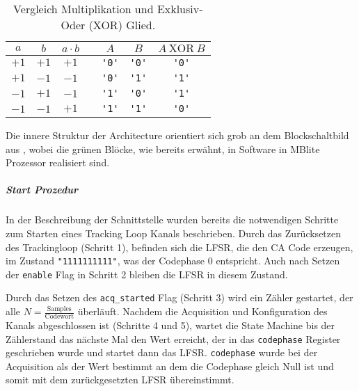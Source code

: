 \begin{table}[H]
    \ttabbox
    {
        \caption[Exklusiv-Oder Glied vs. Multiplikation]{Vergleich Multiplikation und Exklusiv-Oder (XOR) Glied.}
        \label{TabXOR}
    }
    {
    \begin{tabular}{c c c c c c c}
        \toprule
        $a$ 	& $b$ 	& $a\cdot b$ 	& & $A$	& $B$		& $A~ \textrm{XOR} ~B$ \\
        \midrule
        $+1$	& $+1$ 	& $+1$ 		& & \lstinline$'0'$	& \lstinline$'0'$ & \lstinline$'0'$\\
        $+1$	& $-1$ 	& $-1$ 		& & \lstinline$'0'$	& \lstinline$'1'$ & \lstinline$'1'$\\
        $-1$	& $+1$ 	& $-1$ 		& & \lstinline$'1'$	& \lstinline$'0'$ & \lstinline$'1'$\\
        $-1$	& $-1$ 	& $+1$ 		& & \lstinline$'1'$	& \lstinline$'1'$ & \lstinline$'0'$\\
        \bottomrule
    \end{tabular}
}
\end{table}

Die innere Struktur der Architecture orientiert sich grob an dem Blockschaltbild aus , wobei die grünen Blöcke, wie bereits erwähnt, in Software in MBlite Prozessor realisiert sind.

\subparagraph{Start Prozedur} In der Beschreibung der Schnittstelle wurden bereits die notwendigen Schritte zum Starten eines Tracking Loop Kanals beschrieben. Durch das Zurücksetzen des Trackingloop (Schritt 1), befinden sich die LFSR, die den \gls{CA} Code erzeugen, im Zustand \lstinline$"1111111111"$, was der Codephase $0$ entspricht. Auch nach Setzen der \lstinline$enable$ Flag in Schritt 2 bleiben die LFSR in diesem Zustand. 

Durch das Setzen des \lstinline$acq_started$ Flag (Schritt 3) wird ein Zähler gestartet, der alle $N=\frac{\textrm{Samples}}{\textrm{Codewort}}$ überläuft. Nachdem die Acquisition und Konfiguration des Kanals abgeschlossen ist (Schritte 4 und 5), wartet die State Machine bis der Zählerstand das nächste Mal den Wert erreicht, der in das \lstinline$codephase$ Register geschrieben wurde und startet dann das LFSR. \lstinline$codephase$ wurde bei der Acquisition als der Wert bestimmt an dem die Codephase gleich Null ist und somit mit dem zurückgesetzten LFSR übereinstimmt. 